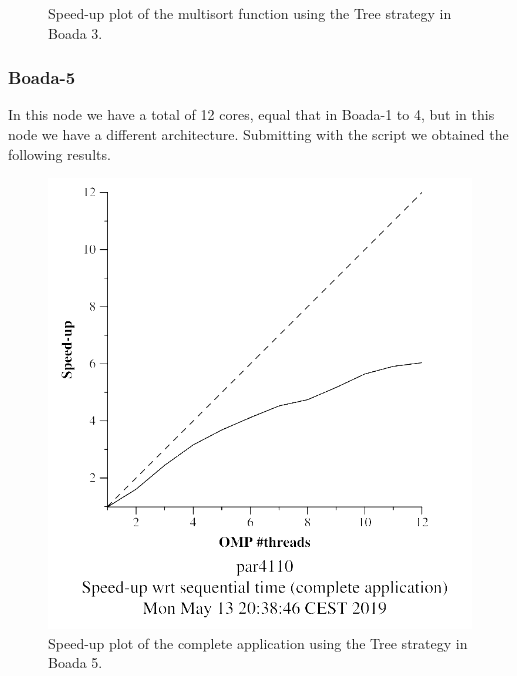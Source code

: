 \documentclass[12pt, a4paper]{article}
\begin{document}
\begin{figure}[H]
\begin{minipage}[b]{0.4\linewidth}
  \caption{Speed-up plot of the multisort function using the Tree strategy in Boada 3.}
  \label{fig:mandel-omp-10000-strong-21-speedup}
\end{minipage}
\end{figure}

\subsubsection{Boada-5}

In this node we have a total of 12 cores, equal that in Boada-1 to 4, but in this node we have a different architecture. Submitting with the script we obtained the following results.

\begin{figure}[H]
\centering
\begin{minipage}[b]{0.4\linewidth}
  \centering
  \includegraphics[scale=0.5]{./S2/multisort-omp-strong_boada-5_tree_complete_application}
  \caption{Speed-up plot of the complete application using the Tree strategy in Boada 5.}
  \label{fig:mandel-omp-10000-strong-21-time}
\end{minipage}%
\hspace{0.5cm}
\begin{minipage}[b]{0.4\linewidth}
  \centering

\end{minipage}
\end{figure}
\end{document}
